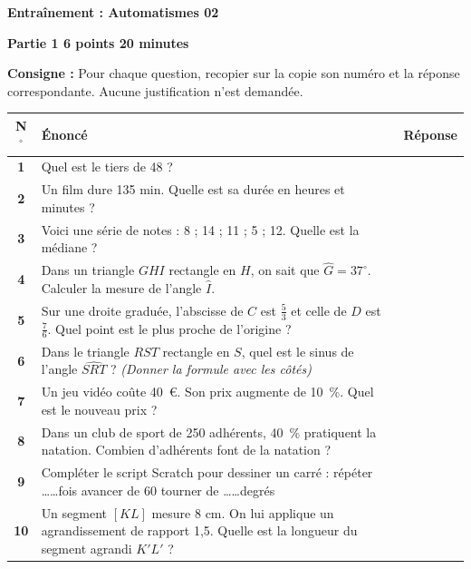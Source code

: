 \documentclass[a4paper,11pt]{article}
\begin{document}
\pagestyle{empty}

\begin{center}
    \Large\textbf{Entraînement : Automatismes 02}
\end{center}

\noindent \textbf{Partie 1 \hfill 6 points \hfill 20 minutes}

\medskip
\noindent \textbf{Consigne :} Pour chaque question, recopier sur la copie son numéro et la réponse correspondante. Aucune justification n'est demandée.

\bigskip

\noindent
\begin{tabularx}{\textwidth}{|c|X|p{4cm}|}
\hline
\textbf{N$^{\circ}$} & \textbf{Énoncé} & \textbf{Réponse} \\ \hline
\textbf{1} & Quel est le tiers de 48 ? & \\ \hline
\textbf{2} & Un film dure 135 min. Quelle est sa durée en heures et minutes ? & \\ \hline
\textbf{3} & Voici une série de notes : 8 ; 14 ; 11 ; 5 ; 12. Quelle est la médiane ? & \\ \hline
\textbf{4} & Dans un triangle $GHI$ rectangle en $H$, on sait que $\widehat{G} = 37^{\circ}$. Calculer la mesure de l'angle $\widehat{I}$. & \\ \hline
\textbf{5} & Sur une droite graduée, l'abscisse de $C$ est $\frac{5}{3}$ et celle de $D$ est $\frac{7}{6}$. Quel point est le plus proche de l'origine ? & \\ \hline
\textbf{6} & Dans le triangle $RST$ rectangle en $S$, quel est le sinus de l'angle $\widehat{SRT}$ ? \textit{(Donner la formule avec les côtés)} & \\ \hline
\textbf{7} & Un jeu vidéo coûte 40~€. Son prix augmente de 10~\%. Quel est le nouveau prix ? & \\ \hline
\textbf{8} & Dans un club de sport de 250 adhérents, 40~\% pratiquent la natation. Combien d'adhérents font de la natation ? & \\ \hline
\textbf{9} & Compléter le script Scratch pour dessiner un carré : \newline répéter \dots\dots fois \newline \hspace*{0.5cm} avancer de 60 \newline \hspace*{0.5cm} tourner de \dots\dots degrés & \\ \hline
\textbf{10} & Un segment $[KL]$ mesure 8 cm. On lui applique un agrandissement de rapport 1,5. Quelle est la longueur du segment agrandi $K'L'$ ? & \\ \hline
\end{tabularx}
\end{document}
